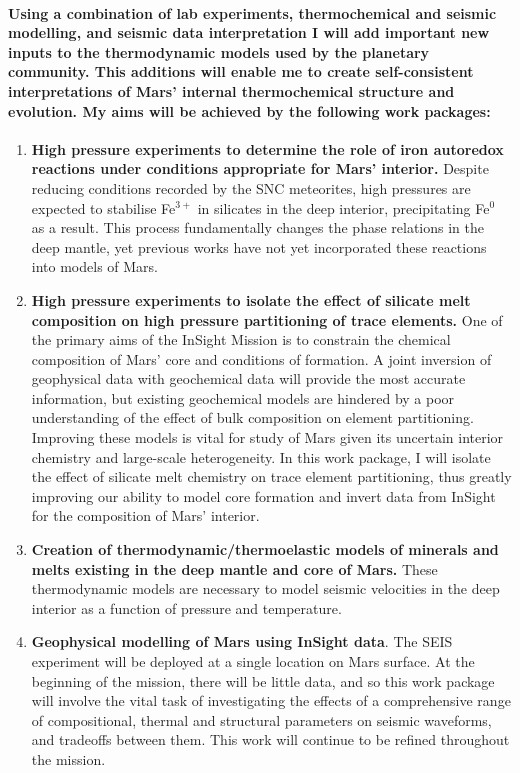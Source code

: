 \documentclass[11pt,twoside,a4paper]{article}
\begin{document}
\paragraph{Using a combination of lab experiments, thermochemical and seismic modelling, and seismic data interpretation I will add important new inputs to the thermodynamic models used by the planetary community. This additions will enable me to create self-consistent interpretations of Mars' internal thermochemical structure and evolution. My aims will be achieved by the following work packages:}
\begin{enumerate}
\item \textbf{High pressure experiments to determine the role of iron autoredox reactions under conditions appropriate for Mars' interior.} Despite reducing conditions recorded by the SNC meteorites, high pressures are expected to stabilise Fe$^{3+}$ in silicates in the deep interior, precipitating Fe$^0$ as a result. This process fundamentally changes the phase relations in the deep mantle, yet previous works have not yet incorporated these reactions into models of Mars.
\item \textbf{High pressure experiments to isolate the effect of silicate melt composition on high pressure partitioning of trace elements.} One of the primary aims of the InSight Mission is to constrain the chemical composition of Mars' core and conditions of formation. A joint inversion of geophysical data with geochemical data will provide the most accurate information, but existing geochemical models are hindered by a poor understanding of the effect of bulk composition on element partitioning. Improving these models is vital for study of Mars given its uncertain interior chemistry and large-scale heterogeneity. In this work package, I will isolate the effect of silicate melt chemistry on trace element partitioning, thus greatly improving our ability to model core formation and invert data from InSight for the composition of Mars' interior.
\item \textbf{Creation of thermodynamic/thermoelastic models of minerals and melts existing in the deep mantle and core of Mars.} These thermodynamic models are necessary to model seismic velocities in the deep interior as a function of pressure and temperature.
\item \textbf{Geophysical modelling of Mars using InSight data}. The SEIS experiment will be deployed at a single location on Mars surface. At the beginning of the mission, there will be little data, and so this work package will involve the vital task of investigating the effects of a comprehensive range of compositional, thermal and structural parameters on seismic waveforms, and tradeoffs between them. This work will continue to be refined throughout the mission.
\end{enumerate}
\end{document}
